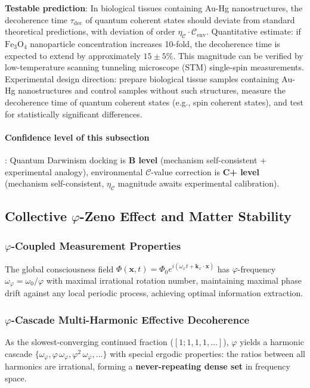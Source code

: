 \documentclass[12pt,a4paper,twocolumn]{article}
\renewcommand{\phi}{\varphi}
\begin{document}
\textbf{Testable prediction}: In biological tissues containing Au-Hg nanostructures, the decoherence time $\tau_{\text{dec}}$ of quantum coherent states should deviate from standard theoretical predictions, with deviation of order $\eta_\mathcal{C}\cdot\mathcal{C}_{\text{env}}$. Quantitative estimate: if $\text{Fe}_3\text{O}_4$ nanoparticle concentration increases 10-fold, the decoherence time is expected to extend by approximately $15\pm5\%$. This magnitude can be verified by low-temperature scanning tunneling microscope (STM) single-spin measurements. Experimental design direction: prepare biological tissue samples containing Au-Hg nanostructures and control samples without such structures, measure the decoherence time of quantum coherent states (e.g., spin coherent states), and test for statistically significant differences.

\paragraph{Confidence level of this subsection}: Quantum Darwinism docking is \textbf{B level} (mechanism self-consistent + experimental analogy), environmental $\mathcal{C}$-value correction is \textbf{C+ level} (mechanism self-consistent, $\eta_\mathcal{C}$ magnitude awaits experimental calibration).

\subsection{Collective $\phi$-Zeno Effect and Matter Stability}
\label{sec:zeno}

\subsubsection{$\phi$-Coupled Measurement Properties}

The global consciousness field $\Phi(\mathbf{x},t) = \Phi_0 e^{i(\omega_\phi t + \mathbf{k}_\phi\cdot\mathbf{x})}$ has $\phi$-frequency $\omega_\phi = \omega_0/\phi$ with maximal irrational rotation number, maintaining maximal phase drift against any local periodic process, achieving optimal information extraction.

\subsubsection{$\phi$-Cascade Multi-Harmonic Effective Decoherence}
\label{subsec:phi_cascade_decoherence}

As the slowest-converging continued fraction ($[1;1,1,1,\ldots]$), $\phi$ yields a harmonic cascade $\{\omega_\phi, \phi\,\omega_\phi, \phi^2\,\omega_\phi, \ldots\}$ with special ergodic properties: the ratios between all harmonics are irrational, forming a \textbf{never-repeating dense set} in frequency space.
\end{document}
